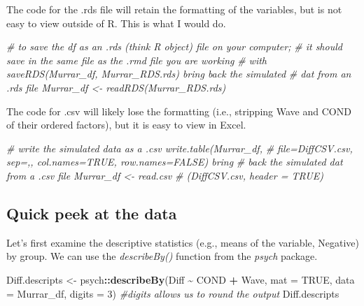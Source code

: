 \documentclass[
  11pt,
]{book}
\newenvironment{Shaded}{\begin{snugshade}}{\end{snugshade}}
\newcommand{\AttributeTok}[1]{\textcolor[rgb]{0.27,0.27,0.27}{#1}}
\newcommand{\CommentTok}[1]{\textcolor[rgb]{0.37,0.37,0.37}{\textit{#1}}}
\newcommand{\ConstantTok}[1]{\textcolor[rgb]{0.37,0.37,0.37}{#1}}
\newcommand{\DecValTok}[1]{\textcolor[rgb]{0.06,0.06,0.06}{#1}}
\newcommand{\FunctionTok}[1]{\textcolor[rgb]{0.27,0.27,0.27}{\textbf{#1}}}
\newcommand{\NormalTok}[1]{#1}
\newcommand{\OtherTok}[1]{\textcolor[rgb]{0.37,0.37,0.37}{#1}}
\newcommand{\SpecialCharTok}[1]{\textcolor[rgb]{0.43,0.43,0.43}{\textbf{#1}}}
\begin{document}
The code for the .rds file will retain the formatting of the variables, but is not easy to view outside of R. This is what I would do.

\begin{Shaded}
\begin{Highlighting}[]
\CommentTok{\# to save the df as an .rds (think \textquotesingle{}R object\textquotesingle{}) file on your computer;}
\CommentTok{\# it should save in the same file as the .rmd file you are working}
\CommentTok{\# with saveRDS(Murrar\_df, \textquotesingle{}Murrar\_RDS.rds\textquotesingle{}) bring back the simulated}
\CommentTok{\# dat from an .rds file Murrar\_df \textless{}{-} readRDS(\textquotesingle{}Murrar\_RDS.rds\textquotesingle{})}
\end{Highlighting}
\end{Shaded}

The code for .csv will likely lose the formatting (i.e., stripping Wave and COND of their ordered factors), but it is easy to view in Excel.

\begin{Shaded}
\begin{Highlighting}[]
\CommentTok{\# write the simulated data as a .csv write.table(Murrar\_df,}
\CommentTok{\# file=\textquotesingle{}DiffCSV.csv\textquotesingle{}, sep=\textquotesingle{},\textquotesingle{}, col.names=TRUE, row.names=FALSE) bring}
\CommentTok{\# back the simulated dat from a .csv file Murrar\_df \textless{}{-} read.csv}
\CommentTok{\# (\textquotesingle{}DiffCSV.csv\textquotesingle{}, header = TRUE)}
\end{Highlighting}
\end{Shaded}

\hypertarget{quick-peek-at-the-data-6}{%
\subsection{Quick peek at the data}\label{quick-peek-at-the-data-6}}

Let's first examine the descriptive statistics (e.g., means of the variable, Negative) by group. We can use the \emph{describeBy()} function from the \emph{psych} package.

\begin{Shaded}
\begin{Highlighting}[]
\NormalTok{Diff.descripts }\OtherTok{\textless{}{-}}\NormalTok{ psych}\SpecialCharTok{::}\FunctionTok{describeBy}\NormalTok{(Diff }\SpecialCharTok{\textasciitilde{}}\NormalTok{ COND }\SpecialCharTok{+}\NormalTok{ Wave, }\AttributeTok{mat =} \ConstantTok{TRUE}\NormalTok{, }\AttributeTok{data =}\NormalTok{ Murrar\_df,}
    \AttributeTok{digits =} \DecValTok{3}\NormalTok{)  }\CommentTok{\#digits allows us to round the output}
\NormalTok{Diff.descripts}
\end{Highlighting}
\end{Shaded}
\end{document}
